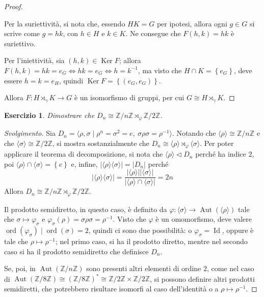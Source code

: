 \documentclass[12pt]{scrartcl}
\theoremstyle{style}
\newtheorem{esercizio}{Esercizio}[section]
\newenvironment{svolgimento}{\renewcommand\qedsymbol{$\blacksquare$}\begin{proof}[Svolgimento]}{\end{proof}}
\numberwithin{equation}{subsection}
\begin{document}
\begin{proof}
\begin{itemize}
				Per la suriettivit\`a, si nota che, essendo $HK = G$ per ipotesi, allora ogni $g \in G$ si scrive come $g = hk$, con $h \in H$ e $k \in K$.
				Ne consegue che $F(h,k) = hk$ \`e suriettivo.

				Per l'iniettivit\`a, sia $(h,k) \in \operatorname{Ker} F$; allora $F(h,k) = hk = e_G \iff hk = e_G \iff h = k^{-1}$, ma visto che $H\cap K = \left\{ e_G \right\} $, deve essere $h=k = e_H$, quindi $\operatorname{Ker} F = \left\{ (e_G,e_G) \right\} $.
		\end{itemize}
	Allora $F: H\rtimes _\gamma K \to G$ \`e un isomorfismo di gruppi, per cui $G \cong H \rtimes _\gamma K$.
	\end{proof}
\begin{esercizio}
Dimostrare che $D_n \cong \mathbb{Z}/ n\mathbb{Z}\rtimes _\varphi \mathbb{Z}/ 2\mathbb{Z}$.
\end{esercizio}
\begin{svolgimento}
	Sia $D_n = \langle \rho , \sigma   \mid \rho ^n = \sigma ^2 = e, \ \sigma \rho \sigma = \rho ^{-1} \rangle$. 
	Notando che $\langle \rho  \rangle\cong \mathbb{Z} / n \mathbb{Z}$ e che $\langle \sigma  \rangle\cong \mathbb{Z} / 2 \mathbb{Z}$, si mostra sostanzialmente che $D_n\cong \langle \rho  \rangle\rtimes_\varphi  \langle \sigma  \rangle$.
	Per poter applicare il teorema di decomposizione, si nota che $\langle \rho  \rangle \lhd D_n$ perch\'e ha indice $2$, poi $\langle \rho  \rangle\cap \langle \sigma  \rangle = \left\{ e \right\} $ e, infine, $\lvert \langle \rho  \rangle\langle \sigma  \rangle \rvert = \lvert D_n \rvert $ perch\'e
\[
\lvert \langle \rho  \rangle\langle \sigma  \rangle \rvert = \frac{\lvert \langle \rho  \rangle \rvert \lvert \langle \sigma  \rangle \rvert }{\lvert \langle \rho  \rangle\cap\langle \sigma  \rangle \rvert } = 2n
\] 
Allora $D_n \cong \mathbb{Z}/n\mathbb{Z}\rtimes _\varphi \mathbb{Z}/2\mathbb{Z}$.

	Il prodotto semidiretto, in questo caso, \`e definito da $\varphi : \langle \sigma  \rangle\to \operatorname{Aut} (\langle \rho  \rangle)$ tale che $\sigma \longmapsto \varphi _\sigma  $ e $\varphi _\sigma (\rho ) = \sigma \rho \sigma = \rho ^{-1}$.
	Visto che $\varphi$ \`e un omomorfismo, deve valere $\operatorname{ord}(\varphi _\sigma )  \mid \operatorname{ord}(\sigma  ) =2$, quindi ci sono due possibilit\`a: o $\varphi _\sigma  = \operatorname{Id} $, oppure \`e tale che $\rho \longmapsto \rho ^{-1}$; nel primo caso, si ha il prodotto diretto, mentre nel secondo caso si ha il prodotto semidiretto che definisce $D_n$.

	Se, poi, in $\operatorname{Aut} (\mathbb{Z}/n\mathbb{Z})$ sono presenti altri elementi di ordine $2$, come nel caso di $\operatorname{Aut} (\mathbb{Z}/8\mathbb{Z})\cong (\mathbb{Z}/8\mathbb{Z})^* \cong \mathbb{Z}/2\mathbb{Z}\times \mathbb{Z}/2\mathbb{Z}$, si possono definire altri prodotti semidiretti, che potrebbero risultare isomorfi al caso dell'identit\`a o a $\rho \longmapsto \rho ^{-1}$.
\end{svolgimento}
\end{document}
